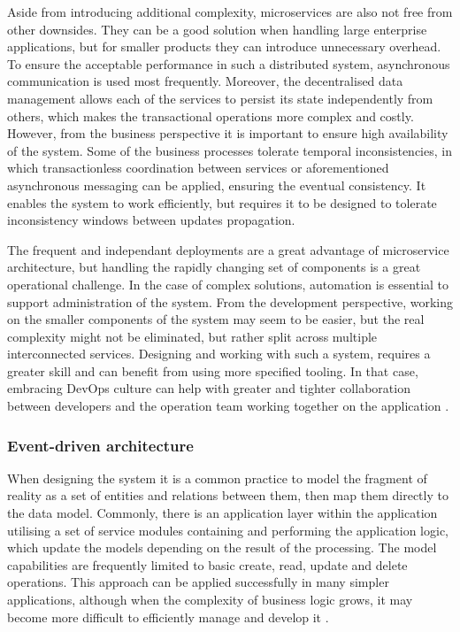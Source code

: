 Aside from introducing additional complexity, microservices are also not free from other downsides. They can be a good solution when handling large enterprise applications, but for smaller products they can introduce unnecessary overhead. To ensure the acceptable performance in such a distributed system, asynchronous communication is used most frequently. Moreover, the decentralised data management allows each of the services to persist its state independently from others, which makes the transactional operations more complex and costly. However, from the business perspective it is important to ensure high availability of the system. Some of the business processes tolerate temporal inconsistencies, in which transactionless coordination between services or aforementioned asynchronous messaging can be applied, ensuring the eventual consistency. It enables the system to work efficiently, but requires it to be designed to tolerate inconsistency windows between updates propagation.

The frequent and independant deployments are a great advantage of microservice architecture, but handling the rapidly changing set of components is a great operational challenge. In the case of complex solutions, automation is essential to support administration of the system. From the development perspective, working on the smaller components of the system may seem to be easier, but the real complexity might not be eliminated, but rather split across multiple interconnected services. Designing and working with such a system, requires a greater skill and can benefit from using more specified tooling. In that case, embracing DevOps culture can help with greater and tighter collaboration between developers and the operation team working together on the application \cite{FowlerMicroservicesTradeoffs}.

\subsubsection{Event-driven architecture} \label{chapter:event-driven-architecture}

When designing the system it is a common practice to model the fragment of reality as a set of entities and relations between them, then map them directly to the data model. Commonly, there is an application layer within the application utilising a set of service modules containing and performing the application logic, which update the models depending on the result of the processing. The model capabilities are frequently limited to basic create, read, update and delete operations. This approach can be applied successfully in many simpler applications, although when the complexity of business logic grows, it may become more difficult to efficiently manage and develop it \cite{FowlerAnemicModel}.

